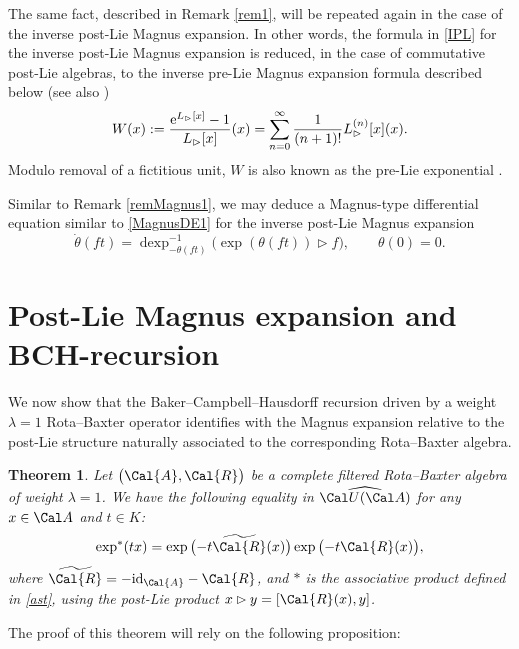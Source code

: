 \documentclass[10pt,a4paper]{amsart}
\numberwithin{equation}{section}
\newtheorem{Theorem}{Theorem}[section]
\begin{document}
\begin{Remark}
The same fact, described in Remark \ref{rem1}, will be repeated again in the case of the inverse post-Lie Magnus expansion. In other words, the formula in \eqref{IPL} for the inverse post-Lie Magnus expansion is reduced, in the case of commutative post-Lie algebras, to the inverse pre-Lie Magnus expansion formula described below (see also \cite{KM08,AL2011})
\begin{gather*}
W(x) := \frac{{\rm e}^{L_{\rhd}[x]} - 1}{L_{\rhd}[x]}(x) = \sum_{n=0}^{\infty}\frac{1}{(n+1)!} L^{(n)}_{\rhd}[x](x).
\end{gather*}
Modulo removal of a fictitious unit, $W$ is also known as the pre-Lie exponential \cite{AG81}.
\end{Remark}

\begin{Remark}%
Similar to Remark \ref{remMagnus1}, we may deduce a Magnus-type differential equation similar to \eqref{MagnusDE1} for the inverse post-Lie Magnus expansion \cite{ELM2015,EIM2017}
\begin{displaymath}
\dot{\theta}(ft) = \operatorname{dexp}^{-1}_{- \theta(ft)}\big( \exp(\theta(ft)) \rhd f \big), \qquad \theta(0)=0.
\end{displaymath}
\end{Remark}

\section{Post-Lie Magnus expansion and BCH-recursion}\label{s4}

We now show that the Baker--Campbell--Hausdorff recursion driven by a weight $\lambda=1$ Rota--Baxter operator identifies with the Magnus expansion relative to the post-Lie structure naturally associated to the corresponding Rota--Baxter algebra.

\begin{Theorem}\label{T9}
Let $\big(\Cal{A}, \Cal{R}\big)$ be a complete filtered Rota--Baxter algebra of weight $\lambda = 1$. We have the following equality in $\widehat{\Cal U(\Cal A)}$ for any $x\in\Cal A$ and $t \in K$:
\begin{equation}\label{ET9}
\exp^{\ast}(tx) = \exp\big({-}t \widetilde{\Cal{R}}(x)\big) \exp\big({-}t \Cal{R}(x)\big),
\end{equation}
where $\widetilde{\Cal{R}}= -{\rm id}_{\Cal{A}}-\Cal{R}$, and $\ast$ is the associative product defined in \eqref{ast}, using the post-Lie product $x \rhd y = [\Cal{R}(x), y]$.
\end{Theorem}
 The proof of this theorem will rely on the following proposition:
\end{document}
